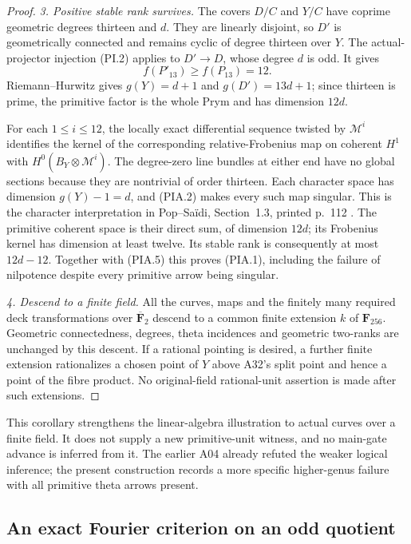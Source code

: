 \documentclass[11pt,a4paper]{article}
\begin{document}
\begin{proof}
\emph{3. Positive stable rank survives.}
The covers $D/C$ and $Y/C$ have coprime geometric degrees
thirteen and $d$. They are linearly disjoint, so $D'$ is
geometrically connected and remains cyclic of degree thirteen
over $Y$. The actual-projector injection (PI.2) applies to
$D'\to D$, whose degree $d$ is odd. It gives
\[
                            f(P'_{13})\ge f(P_{13})=12.
 \tag{PIA.5}
\]
Riemann--Hurwitz gives $g(Y)=d+1$ and $g(D')=13d+1$;
since thirteen is prime, the primitive factor is the whole
Prym and has dimension $12d$.

For each $1\le i\le12$, the locally exact differential
sequence twisted by $\mathcal M^i$ identifies the kernel of
the corresponding relative-Frobenius map on coherent $H^1$
with $H^0(B_Y\otimes\mathcal M^i)$. The degree-zero line
bundles at either end have no global sections because they
are nontrivial of order thirteen. Each character space has
dimension $g(Y)-1=d$, and (PIA.2) makes every such map
singular. This is the character interpretation in
Pop--Sa\"idi, Section~1.3, printed p.~112 \cite{PopSaidi}.
The primitive coherent space is their direct sum, of dimension
$12d$; its Frobenius kernel has dimension at least twelve.
Its stable rank is consequently at most $12d-12$.
Together with (PIA.5) this proves (PIA.1), including the
failure of nilpotence despite every primitive arrow being
singular.

\emph{4. Descend to a finite field.}
All the curves, maps and the finitely many required deck
transformations over $\overline{\mathbf F}_2$ descend to
a common finite extension $k$ of $\mathbf F_{256}$.
Geometric connectedness, degrees, theta incidences and
geometric two-ranks are unchanged by this descent.
If a rational pointing is desired, a further finite extension
rationalizes a chosen point of $Y$ above A32's split point
and hence a point of the fibre product. No original-field
rational-unit assertion is made after such extensions.
\end{proof}

This corollary strengthens the linear-algebra illustration to
actual curves over a finite field. It does not supply a new
primitive-unit witness, and no main-gate advance is inferred
from it. The earlier A04 already refuted the weaker logical
inference; the present construction records a more specific
higher-genus failure with all primitive theta arrows present.


\subsection{An exact Fourier criterion on an odd quotient}
\label{sec:odd-quotient-fourier}
\end{document}
